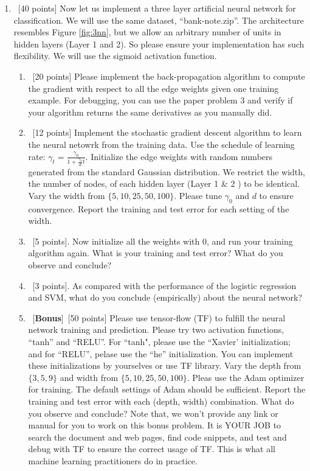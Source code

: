 \documentclass[12pt, fullpage,letterpaper]{article}
\begin{document}
\begin{enumerate}
\item~[40 points] Now let us implement a three layer artificial neural network for classification. We will use the same dataset, ``bank-note.zip''. The architecture resembles Figure \ref{fig:3nn}, but we allow an arbitrary number of  units in hidden layers (Layer 1  and 2). So please ensure your implementation has such flexibility. We will use the sigmoid activation function. 

\begin{enumerate}
	\item ~[20 points] Please implement the back-propagation algorithm to compute the gradient with respect to all the edge weights given one training example.  For debugging, you can use the paper problem 3 and verify if your algorithm returns the same derivatives as you manually did. 
	
	\item~[12 points] Implement the stochastic gradient descent algorithm to learn the neural netowrk from the training data.  	Use the schedule of learning rate: $\gamma_t = \frac{\gamma_0}{1+\frac{\gamma_0}{d}t}	$.  Initialize the edge weights with random numbers generated from the standard Gaussian distribution. We restrict the width, \ie the number of nodes, of each hidden layer (\ie Layer 1 \& 2 ) to be identical.  Vary the width from $\{5, 10, 25, 50, 100\}$. Please tune $\gamma_0$ and $d$ to ensure convergence. Report the training and test error for each setting of the width.
	
	
	\item~[5 points]. Now initialize all the weights with $0$, and run your training algorithm again. What is your training and test error? What do you observe and  conclude?
	
	\item~[3 points]. As compared with the performance of the logistic regression and SVM, what do you conclude (empirically) about the neural network?
	
	
	\item~[\textbf{Bonus}]~[50 points] Please use tensor-flow (TF) to fulfill the neural network training and prediction. Please try two activation functions, ``tanh'' and ``RELU''.  For ``tanh", please use the ``Xavier' initialization; and for ``RELU'', pelase use the ``he'' initialization. You can implement these initializations by yourselves or use TF library. 
	Vary the depth from $\{3, 5, 9\} $ and width from $\{5, 10, 25, 50, 100\}$. Pleas use the Adam optimizer for training. The default settings of Adam should be sufficient. 
	 Report the training and test error with each (depth, width) combination. What do you observe and conclude? Note that, we won't provide any link or manual for you to work on this bonus problem. It is YOUR JOB to search the document and web pages, find  code snippets, and test and debug with TF to ensure the correct usage of  TF. This is what all machine learning practitioners do in practice. 
	

\end{enumerate}
\end{enumerate}
\end{document}
